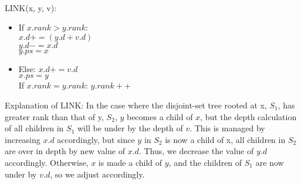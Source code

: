 \documentclass[letterpaper,10pt]{article}
\begin{document}
\begin{enumerate}
\begin{enumerate}
\\LINK(x, y, v):
\begin{itemize}
\item If $x.rank > y.rank$: 
\\ $x.d += (y.d + v.d)$
\\ $y.d -= x.d$
\\ $y.ps = x$
\item Else: $x.d += v.d$
\\ $x.ps = y$
\\ If $x.rank = y.rank$: $y.rank ++$
\end{itemize}
Explanation of LINK: In the case where the disjoint-set tree rooted at x, $S_1$, has greater rank than that of y, $S_2$, $y$ becomes a child of $x$, but the depth calculation of all children in $S_1$ will be under by the depth of $v$. This is managed by increasing $x.d$ accordingly, but since $y$ in $S_2$ is now a child of x, all children in $S_2$ are over in depth by new value of $x.d$. Thus, we decrease the value of $y.d$ accordingly. Otherwise, $x$ is made a child of $y$, and the children of $S_1$ are now under by $v.d$, so we adjust accordingly. 
\end{enumerate}
\end{enumerate}
\end{document}
